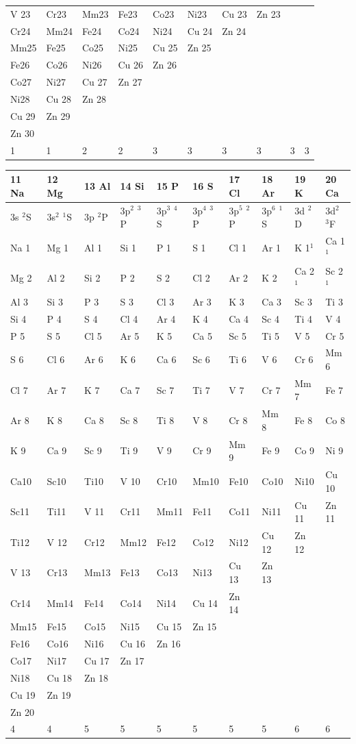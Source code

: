 \begin{table}
\begin{tabular}{llllllllll}
V 23& Cr23& Mm23& Fe23& Co23& Ni23& Cu 23& Zn 23\\
Cr24& Mm24& Fe24& Co24& Ni24& Cu 24& Zn 24\\
Mm25& Fe25& Co25& Ni25& Cu 25& Zn 25\\
Fe26& Co26& Ni26& Cu 26& Zn 26\\
Co27& Ni27& Cu 27& Zn 27\\
Ni28& Cu 28& Zn 28\\
Cu 29& Zn 29\\
Zn 30\\
1&1&2&2&3&3&3&3&3&3\\
\hline
\end{tabular}
\end{table}

\begin{tabular}{llllllllll}
\hline
11 Na&  12 Mg&  13 Al&  14 Si&  15 P&   16 S&   17 Cl&  18 Ar&  19 K&   20
Ca\\
\hline
3s $^2$S& 3s$^2$ $^1$S& 3p $^2$P& 3p$^2$ $^3$P& 3p$^3$ $^4$S& 3p$^4$ $^3$P&
3p$^5$ $^2$P& 3p$^6$ $^1$S& 3d $^2$D& 3d$^2$ $^3$F\\
Na 1& Mg 1& Al 1& Si 1& P
1& S  1& Cl 1& Ar 1& K  1$^1$ & Ca 1$^1$\\
Mg 2& Al 2& Si 2& P  2& S  2& Cl 2& Ar 2& K  2& Ca 2$^1$& Sc 2$^1$\\
Al 3& Si
3& P 3& S  3& Cl 3& Ar 3& K  3& Ca 3& Sc 3& Ti 3\\
Si 4& P 4& S  4& Cl 4& Ar 4& K  4& Ca 4& Sc 4& Ti 4& V 4\\
P 5& S  5& Cl 5& Ar 5& K  5& Ca 5& Sc 5& Ti 5& V  5& Cr 5\\
S  6& Cl 6& Ar 6& K  6& Ca 6& Sc 6& Ti 6& V
6& Cr 6& Mm 6\\
Cl 7& Ar 7& K  7& Ca 7& Sc 7& Ti 7& V  7& Cr 7& Mm 7& Fe 7\\
Ar 8& K  8& Ca 8& Sc 8& Ti 8& V
8& Cr 8& Mm 8& Fe 8& Co 8\\
K  9& Ca 9& Sc 9& Ti 9& V  9& Cr 9& Mm 9& Fe 9& Co 9& Ni 9\\
Ca10& Sc10& Ti10& V
10& Cr10& Mm10& Fe10& Co10& Ni10& Cu 10\\
 Sc11& Ti11& V 11& Cr11& Mm11& Fe11& Co11& Ni11& Cu 11& Zn 11\\
 Ti12& V
12& Cr12& Mm12& Fe12& Co12& Ni12& Cu 12& Zn 12\\
V 13& Cr13& Mm13& Fe13& Co13& Ni13& Cu 13& Zn
13\\
Cr14& Mm14& Fe14& Co14& Ni14& Cu 14& Zn 14\\
 Mm15& Fe15& Co15& Ni15& Cu 15& Zn 15\\
Fe16& Co16& Ni16& Cu
16& Zn 16\\
Co17& Ni17& Cu 17&  Zn 17\\
Ni18& Cu 18&  Zn 18\\
Cu 19& Zn 19\\
Zn 20\\
4& 4&5&5&5&5&5&5&6&6\\
\hline
\end{tabular}

